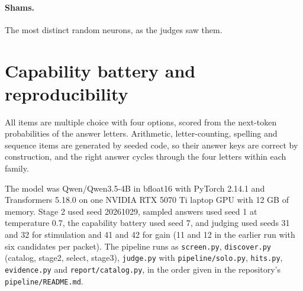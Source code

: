 \documentclass[11pt]{article}
\begin{document}


\paragraph{Shams.} The \NShamJudged most distinct random neurons, as the judges saw them.



\clearpage
\section{Capability battery and reproducibility}
\label{app:repro}

\begin{center}

\end{center}

All items are multiple choice with four options, scored from the next-token probabilities of the answer letters.
Arithmetic, letter-counting, spelling and sequence items are generated by seeded code, so their answer keys are
correct by construction, and the right answer cycles through the four letters within each family.

The model was Qwen/Qwen3.5-4B in bfloat16 with PyTorch 2.14.1 and Transformers 5.18.0 on one NVIDIA RTX 5070 Ti
laptop GPU with 12 GB of memory. Stage 2 used seed 20261029, sampled answers used seed 1 at temperature 0.7, the
capability battery used seed 7, and judging used seeds 31 and 32 for stimulation and 41 and 42 for gain (11 and
12 in the earlier run with six candidates per packet). The pipeline runs as
\texttt{screen.py}, \texttt{discover.py} (catalog, stage2, select, stage3), \texttt{judge.py} with \texttt{pipeline/solo.py}, \texttt{hits.py},
\texttt{evidence.py} and \texttt{report/catalog.py}, in the order given in the repository's
\texttt{pipeline/README.md}.
\end{document}
